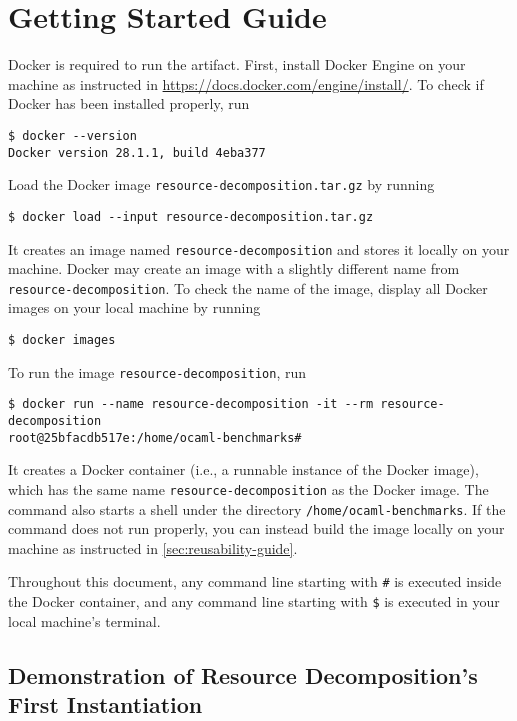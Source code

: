 
\section{Getting Started Guide}
\label{sec:getting-started-guide}

Docker is required to run the artifact.
%
First, install Docker Engine on your machine as instructed in
\url{https://docs.docker.com/engine/install/}.
%
To check if Docker has been installed properly, run
\begin{verbatim}
$ docker --version
Docker version 28.1.1, build 4eba377
\end{verbatim}

Load the Docker image \texttt{resource-decomposition.tar.gz} by running
\begin{verbatim}
$ docker load --input resource-decomposition.tar.gz
\end{verbatim}
%
It creates an image named \texttt{resource-decomposition} and stores it locally
on your machine.
%
Docker may create an image with a slightly different name from
\texttt{resource-decomposition}.
%
To check the name of the image, display all Docker images on your local machine
by running
\begin{verbatim}
$ docker images
\end{verbatim}

To run the image \texttt{resource-decomposition}, run
\begin{verbatim}
$ docker run --name resource-decomposition -it --rm resource-decomposition
root@25bfacdb517e:/home/ocaml-benchmarks#
\end{verbatim}
%
It creates a Docker container (i.e., a runnable instance of the Docker image),
which has the same name \texttt{resource-decomposition} as the Docker image.
%
The command also starts a shell under the directory
\texttt{/home/ocaml-benchmarks}.
%
If the command does not run properly, you can instead build the image locally on
your machine as instructed in \cref{sec:reusability-guide}.

Throughout this document, any command line starting with \texttt{\#} is executed
inside the Docker container, and any command line starting with \texttt{\$} is
executed in your local machine's terminal.

\subsection{Demonstration of Resource Decomposition's First Instantiation}

